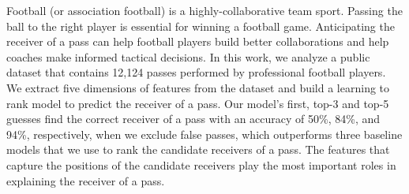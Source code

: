 Football (or association football) is a highly-collaborative team sport. 
Passing the ball to the right player is essential for winning a football game.
Anticipating the receiver of a pass can help football players build better collaborations and help coaches make informed tactical decisions.
In this work, we analyze a public dataset that contains 12,124 passes performed by professional football players.
We extract five dimensions of features from the dataset and build a learning to rank model to predict the receiver of a pass. 
Our model's first, top-3 and top-5 guesses find the correct receiver of a pass with an accuracy of 50\%, 84\%, and 94\%, respectively, when we exclude false passes, 
which outperforms three baseline models that we use to rank the candidate receivers of a pass.
The features that capture the positions of the candidate receivers play the most important roles in explaining the receiver of a pass.

